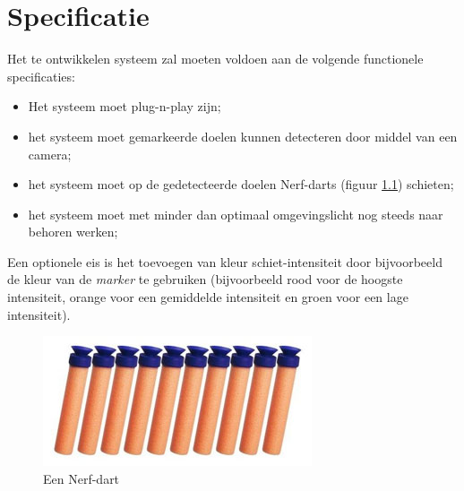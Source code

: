 \chapter{Specificatie}

Het te ontwikkelen systeem zal moeten voldoen aan de volgende functionele
specificaties:

\begin{itemize}
    \item Het systeem moet plug-n-play zijn;
    \item het systeem moet gemarkeerde doelen kunnen detecteren door middel van
        een camera;
    \item het systeem moet op de gedetecteerde doelen Nerf-darts (figuur
        \ref{fig:dart}) schieten;
    \item het systeem moet met minder dan optimaal omgevingslicht nog steeds
        naar behoren werken;
\end{itemize}

Een optionele eis is het toevoegen van kleur schiet-intensiteit door
bijvoorbeeld de kleur van de \emph{marker} te gebruiken (bijvoorbeeld rood
voor de hoogste intensiteit, orange voor een gemiddelde intensiteit en groen
voor een lage intensiteit).

\begin{figure}
    \begin{center}
        \includegraphics[scale=0.75]{figures/darts.jpg}
    \end{center}
    \caption{Een Nerf-dart}
    \label{fig:dart}
\end{figure}
